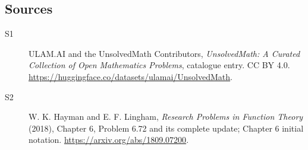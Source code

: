 \documentclass[11pt]{article}
\begin{document}
\subsection{Sources}
\begin{description}
\item[\hypertarget{source:statement:1}{S1}] ULAM.AI and the UnsolvedMath Contributors, \emph{UnsolvedMath: A Curated Collection of Open Mathematics Problems}, catalogue entry. CC BY 4.0. \url{https://huggingface.co/datasets/ulamai/UnsolvedMath}.
\item[\hypertarget{source:statement:2}{S2}] W. K. Hayman and E. F. Lingham, \emph{Research Problems in Function Theory} (2018), Chapter 6, Problem 6.72 and its complete update; Chapter 6 initial notation. \url{https://arxiv.org/abs/1809.07200}.
\end{description}
\label{end:statement}
\end{document}
